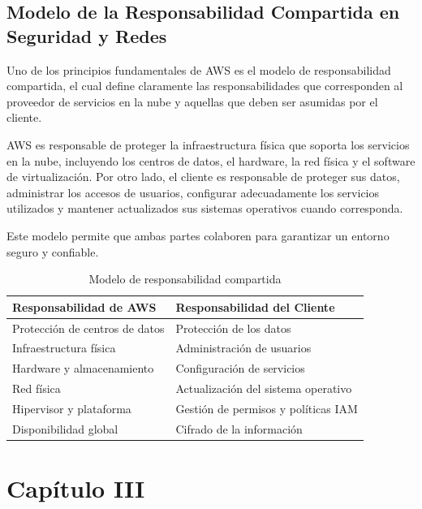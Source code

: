 \documentclass[12pt,a4paper]{article}
\begin{document}
\subsection{Modelo de la Responsabilidad Compartida en Seguridad y Redes}

Uno de los principios fundamentales de AWS es el modelo de responsabilidad compartida, el cual define claramente las responsabilidades que corresponden al proveedor de servicios en la nube y aquellas que deben ser asumidas por el cliente.

AWS es responsable de proteger la infraestructura física que soporta los servicios en la nube, incluyendo los centros de datos, el hardware, la red física y el software de virtualización. Por otro lado, el cliente es responsable de proteger sus datos, administrar los accesos de usuarios, configurar adecuadamente los servicios utilizados y mantener actualizados sus sistemas operativos cuando corresponda.

Este modelo permite que ambas partes colaboren para garantizar un entorno seguro y confiable.

\begin{table}[H]
\centering
\caption{Modelo de responsabilidad compartida}
\begin{tabularx}{\textwidth}{XX}
\toprule
\textbf{Responsabilidad de AWS} & \textbf{Responsabilidad del Cliente}\\
\midrule
Protección de centros de datos & Protección de los datos\\

Infraestructura física & Administración de usuarios\\

Hardware y almacenamiento & Configuración de servicios\\

Red física & Actualización del sistema operativo\\

Hipervisor y plataforma & Gestión de permisos y políticas IAM\\

Disponibilidad global & Cifrado de la información\\
\bottomrule
\end{tabularx}
\end{table}

\section{Capítulo III}
\end{document}
